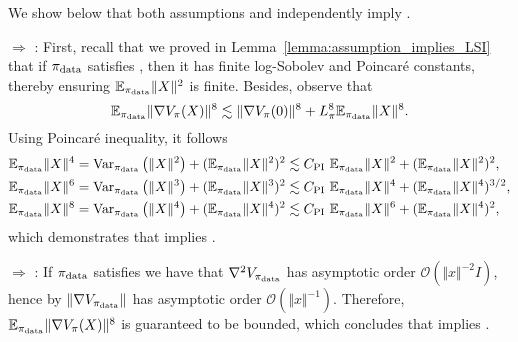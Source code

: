     We show below that both assumptions  and  independently imply . 

\textbf{ $\Rightarrow$ }: First, recall that we proved in Lemma~\ref{lemma:assumption_implies_LSI} that if $\operatorname*{\pi_{\text{data}}}$ satisfies , then it has finite log-Sobolev and Poincaré constants, thereby ensuring $\mathbb{E}_{\operatorname*{\pi_{\text{data}}}} \Vert X\Vert^2$ is finite. Besides, observe that 
\begin{equation*}
    \mathbb{E}_{\operatorname*{\pi_{\text{data}}}} \Vert \nabla V_\pi(X)\Vert^8 \lesssim \Vert \nabla V_\pi(0) \Vert^8 +  L_\pi^8\mathbb{E}_{\operatorname*{\pi_{\text{data}}}} \Vert X\Vert^8.
\end{equation*}
Using Poincaré inequality, it follows
\begin{align*}
    \mathbb{E}_{\operatorname*{\pi_{\text{data}}}} \Vert X\Vert^4 &= \text{Var}_{\operatorname*{\pi_{\text{data}}}} \left(\Vert X\Vert^2\right) + (\mathbb{E}_{\operatorname*{\pi_{\text{data}}}} \Vert X\Vert^2)^2 \lesssim C_{\text{PI}}\ \mathbb{E}_{\operatorname*{\pi_{\text{data}}}}\Vert X\Vert^2 + (\mathbb{E}_{\operatorname*{\pi_{\text{data}}}} \Vert X\Vert^2)^2,\\
    \mathbb{E}_{\operatorname*{\pi_{\text{data}}}} \Vert X\Vert^6 &= \text{Var}_{\operatorname*{\pi_{\text{data}}}} \left(\Vert X\Vert^3\right) + (\mathbb{E}_{\operatorname*{\pi_{\text{data}}}} \Vert X\Vert^3)^2 \lesssim C_{\text{PI}}\ \mathbb{E}_{\operatorname*{\pi_{\text{data}}}}\Vert X\Vert^4 + (\mathbb{E}_{\operatorname*{\pi_{\text{data}}}} \Vert X\Vert^4)^{3/2},\\
    \mathbb{E}_{\operatorname*{\pi_{\text{data}}}} \Vert X\Vert^8 &= \text{Var}_{\operatorname*{\pi_{\text{data}}}} \left(\Vert X\Vert^4\right) + (\mathbb{E}_{\operatorname*{\pi_{\text{data}}}} \Vert X\Vert^4)^2 \lesssim C_{\text{PI}}\ \mathbb{E}_{\operatorname*{\pi_{\text{data}}}}\Vert X\Vert^6 + (\mathbb{E}_{\operatorname*{\pi_{\text{data}}}} \Vert X\Vert^4)^2,
\end{align*}
which demonstrates that  implies .

\textbf{ $\Rightarrow$ }: If $\operatorname*{\pi_{\text{data}}}$ satisfies  we have that $\nabla^2 V_{\operatorname*{\pi_{\text{data}}}}$ has asymptotic order $\mathcal{O}\left(\Vert x\Vert^{-2}I\right)$, hence by \citet{RefWorks:RefID:90-1973infinitesimal} $\Vert \nabla V_{\operatorname*{\pi_{\text{data}}}}\Vert$ has asymptotic order $\mathcal{O}\left(\Vert x\Vert^{-1}\right)$. Therefore, $\mathbb{E}_{\operatorname*{\pi_{\text{data}}}} \Vert \nabla V_{\pi} (X)\Vert^8$ is guaranteed to be bounded, which concludes that  implies .
